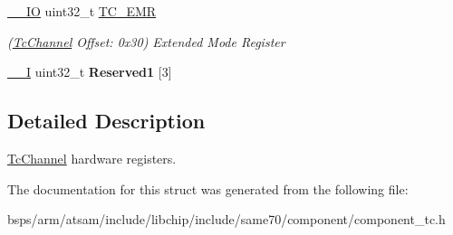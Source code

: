 \begin{DoxyCompactItemize}
\mbox{\label{structTcChannel_acd0843f5d0c344e399a2ff497b5c2723}} 
\mbox{\hyperlink{core__cm7_8h_aec43007d9998a0a0e01faede4133d6be}{\+\_\+\+\_\+\+IO}} uint32\+\_\+t \mbox{\hyperlink{structTcChannel_acd0843f5d0c344e399a2ff497b5c2723}{T\+C\+\_\+\+E\+MR}}
\begin{DoxyCompactList}\small\item\em (\mbox{\hyperlink{structTcChannel}{Tc\+Channel}} Offset\+: 0x30) Extended Mode Register \end{DoxyCompactList}\item 
\mbox{\label{structTcChannel_a25f7785661b04ea0112ca6204273970f}} 
\mbox{\hyperlink{core__cm7_8h_af63697ed9952cc71e1225efe205f6cd3}{\+\_\+\+\_\+I}} uint32\+\_\+t {\bfseries Reserved1} \mbox{[}3\mbox{]}
\end{DoxyCompactItemize}


\subsection{Detailed Description}
\mbox{\hyperlink{structTcChannel}{Tc\+Channel}} hardware registers. 

The documentation for this struct was generated from the following file\+:\begin{DoxyCompactItemize}
\item 
bsps/arm/atsam/include/libchip/include/same70/component/component\+\_\+tc.\+h\end{DoxyCompactItemize}
